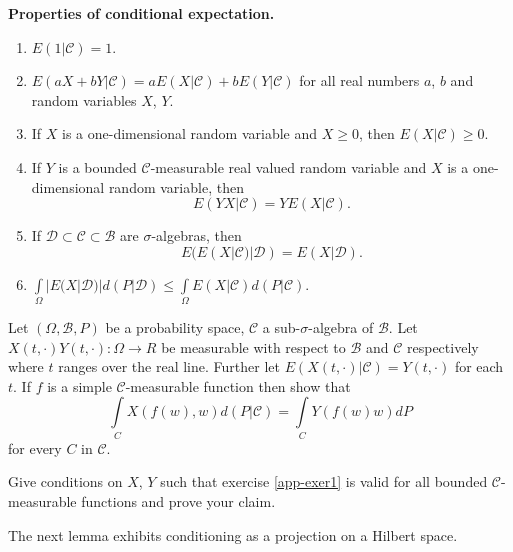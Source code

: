 \noindent
{\bf Properties of conditional expectation.}
\begin{enumerate}
\item $E(1|\mathscr{C})=1$.

\item $E(aX+bY|\mathscr{C})=aE(X|\mathscr{C})+bE(Y|\mathscr{C})$ for
  all real numbers $a$, $b$ and random variables $X$, $Y$.

\item If $X$ is a one-dimensional random variable and $X\geq 0$, then\break
  $E(X|\mathscr{C})\geq 0$.

\item If $Y$ is a bounded $\mathscr{C}$-measurable real valued random
  variable and $X$ is a one-dimensional random variable, then 
$$
E(YX|\mathscr{C})=YE(X|\mathscr{C}).
$$

\item If $\mathscr{D}\subset \mathscr{C}\subset \mathscr{B}$ are
  $\sigma$-algebras, then
$$
E(E(X|\mathscr{C})|\mathscr{D})=E(X|\mathscr{D}).
$$

\item $\int\limits_{\Omega}|E(X|\mathscr{D})|d(P|\mathscr{D})\leq
  \int\limits_{\Omega}E(X|\mathscr{C})d(P|\mathscr{C})$.\pageoriginale 
\end{enumerate}

\setcounter{exercise}{0}
\begin{exercise}\label{app-exer1}
Let $(\Omega,\mathscr{B},P)$ be a probability space, $\mathscr{C}$ a
sub-$\sigma$-algebra of $\mathscr{B}$. Let
$X(t,\cdot)Y(t,\cdot):\Omega\to R$ be measurable with respect to
$\mathscr{B}$ and $\mathscr{C}$ respectively where $t$ ranges over the
real line. Further let $E(X(t,\cdot)|\mathscr{C})=Y(t,\cdot)$ for each
$t$. If $f$ is a simple $\mathscr{C}$-measurable function then show
that
$$
\int\limits_{C}X(f(w),w)d(P|\mathscr{C})=\int\limits_{C}Y(f(w)w)dP
$$
for every $C$ in $\mathscr{C}$.
\end{exercise}


\begin{exercise}\label{app-exer2}
Give conditions on $X$, $Y$ such that exercise \ref{app-exer1} is
valid for all bounded $\mathscr{C}$-measurable functions and prove
your claim.

The next lemma exhibits conditioning as a projection on a Hilbert space.
\end{exercise}

